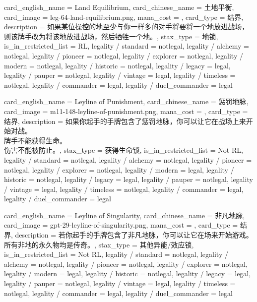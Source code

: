 \documentclass[lang = cn, color = black, 10pt]{AllThatStax}
\begin{document}
\card
{
	card_english_name = {Land Equilibrium},
	card_chinese_name = {土地平衡},
	card_image = leg-64-land-equilibrium.png,
	mana_cost = ,
	card_type = 结界,
	description = {如果某位操控的地至少与你一样多的对手将要将一个地放进战场，则该牌手改为将该地放进战场，然后牺牲一个地。},
	stax_type = 地锁,
	is_in_restricted_list = RL,
	legality / standard = notlegal,
	legality / alchemy = notlegal,
	legality / pioneer = notlegal,
	legality / explorer = notlegal,
	legality / modern = notlegal,
	legality / historic = notlegal,
	legality / legacy = legal,
	legality / pauper = notlegal,
	legality / vintage = legal,
	legality / timeless = notlegal,
	legality / commander = legal,
	legality / duel_commander = legal
}

\card
{
	card_english_name = {Leyline of Punishment},
	card_chinese_name = {惩罚地脉},
	card_image = m11-148-leyline-of-punishment.png,
	mana_cost = ,
	card_type = 结界,
	description = {如果你起手的手牌包含了惩罚地脉，你可以让它在战场上来开始对战。\\
牌手不能获得生命。\\
伤害不能被防止。},
	stax_type = 获得生命锁,
	is_in_restricted_list = Not RL,
	legality / standard = notlegal,
	legality / alchemy = notlegal,
	legality / pioneer = notlegal,
	legality / explorer = notlegal,
	legality / modern = legal,
	legality / historic = notlegal,
	legality / legacy = legal,
	legality / pauper = notlegal,
	legality / vintage = legal,
	legality / timeless = notlegal,
	legality / commander = legal,
	legality / duel_commander = legal
}

\card
{
	card_english_name = {Leyline of Singularity},
	card_chinese_name = {非凡地脉},
	card_image = gpt-29-leyline-of-singularity.png,
	mana_cost = ,
	card_type = 结界,
	description = {若你起手的手牌包含了非凡地脉，你可以让它在场来开始游戏。\\
所有非地的永久物均是传奇。},
	stax_type = 其他异能/效应锁,
	is_in_restricted_list = Not RL,
	legality / standard = notlegal,
	legality / alchemy = notlegal,
	legality / pioneer = notlegal,
	legality / explorer = notlegal,
	legality / modern = legal,
	legality / historic = notlegal,
	legality / legacy = legal,
	legality / pauper = notlegal,
	legality / vintage = legal,
	legality / timeless = notlegal,
	legality / commander = legal,
	legality / duel_commander = legal
}
\end{document}
